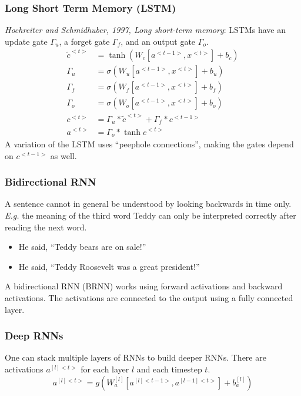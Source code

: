 \documentclass{article}
\begin{document}
\subsubsection{Long Short Term Memory (LSTM)}
\emph{Hochreiter and Schmidhuber, 1997, Long short-term memory}:
LSTMs have an update gate $\Gamma_u$, a forget gate $\Gamma_f$, and an output gate $\Gamma_o$.
\begin{equation}
  \begin{split}
    \tilde{c}^{<t>}&=\tanh(W_c[a^{<t-1>},x^{<t>}]+b_c)\\
    \Gamma_u&=\sigma(W_u[a^{<t-1>},x^{<t>}]+b_u)\\
    \Gamma_f&=\sigma(W_f[a^{<t-1>},x^{<t>}]+b_f)\\
    \Gamma_o&=\sigma(W_o[a^{<t-1>},x^{<t>}]+b_o)\\
    c^{<t>}&=\Gamma_u*\tilde{c}^{<t>}+\Gamma_f*c^{<t-1>}\\
    a^{<t>}&=\Gamma_o*\tanh c^{<t>}
  \end{split}
\end{equation}
A variation of the LSTM uses ``peephole connections'', making the gates depend on $c^{<t-1>}$ as well.

\subsubsection{Bidirectional RNN}
A sentence cannot in general be understood by looking backwards in time only.
\emph{E.g.} the meaning of the third word Teddy can only be interpreted correctly after reading the next word.
\begin{itemize}
  \item He said, ``Teddy bears are on sale!''
  \item He said, ``Teddy Roosevelt was a great president!''
\end{itemize}
A bidirectional RNN (BRNN) works using forward activations and backward activations.
The activations are connected to the output using a fully connected layer.

\subsubsection{Deep RNNs}
One can stack multiple layers of RNNs to build deeper RNNs.
There are activations $a^{[l]<t>}$ for each layer $l$ and each timestep $t$.
\begin{equation}
  a^{[l]<t>}=g(W_a^{[l]}[a^{[l]<t-1>},a^{[l-1]<t>}]+b_a^{[l]})
\end{equation}
\end{document}
